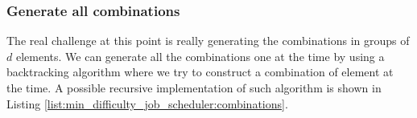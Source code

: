 \subsubsection{Generate all combinations}
The real challenge at this point is really generating the combinations in groups of $d$ elements. 
We can generate all the combinations one at the time by using a backtracking algorithm where we try to construct a combination of element at the time.
A possible recursive implementation of such algorithm is shown in Listing \ref{list:min_difficulty_job_scheduler:combinations}.


\begin{minipage}{\linewidth}
	
\end{minipage}


